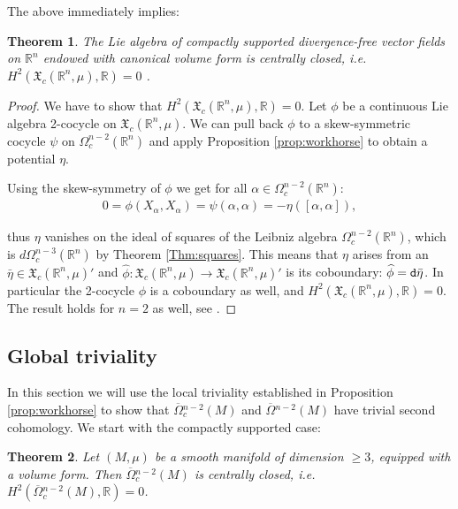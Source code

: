 \documentclass{article}
\newcommand{\fX}{\mathfrak{X}}
\newcommand{\R}{\mathbb{R}}
\newcommand{\oline}{\overline}
\newcommand{\dd}{{\tt d}}
\newtheorem{Theorem}{Theorem}[section]
\theoremstyle{definition}
\begin{document}
The above immediately implies:

\begin{Theorem}
\label{thm:local}
The Lie algebra of compactly supported divergence-free vector fields on $\R^n$ endowed with canonical volume form is centrally closed, i.e.~$H^2(\fX_c(\R^n,\mu),\R)=0$ .
\end{Theorem}

\begin{proof}
We have to show that $H^2(\fX_c(\R^n,\mu),\R)=0$. Let $\phi$ be a continuous Lie algebra 2-cocycle on $\fX_{c}(\R^n,\mu)$. We can pull back $\phi$ to a skew-symmetric cocycle $\psi$ on $\Omega^{n-2}_c(\R^n)$ and apply Proposition \ref{prop:workhorse} to obtain a potential $\eta$.


Using the skew-symmetry of $\phi$ we get for all $\alpha\in\Omega_c^{n-2}(\mathbb R^n)$:
\begin{align}\label{eq:vanonex}
  0=\phi(X_\alpha,X_\alpha)
  =\psi(\alpha,\alpha)
  =-\eta([\alpha,\alpha]),  
\end{align}

thus $\eta$ vanishes on the ideal of squares of the Leibniz algebra $\Omega_c^{n-2}(\mathbb R^n)$, which is  $d\Omega^{n-3}_{c}(\R^n)$ by Theorem \ref{Thm:squares}.
This means that $\eta$ arises from an $\bar\eta\in\fX_c(\R^n,\mu)'$ and $\widehat\phi \colon \fX_{c}(\R^n, \mu) \rightarrow  \fX_{c}(\R^n, \mu)'$ is its coboundary: $\widehat\phi=\dd\bar\eta$.
In particular the 2-cocycle $\phi$ is a coboundary as well, and $H^2(\fX_c(\R^n,\mu),\R)=0$.
The result holds for $n=2$ as well, see \cite{JV16}.
\end{proof}





\subsection{Global triviality}\label{subs:globtriv}

In this section we will use the local triviality established in Proposition \ref{prop:workhorse} to show that $\oline{\Omega}{}_c^{n-2}(M)$ and $\oline{\Omega}{}^{n-2}(M)$ have trivial second cohomology. We start with the compactly supported case:



\begin{Theorem} \label{prop:mainc}Let $(M,\mu)$ be a smooth manifold of dimension $\geq 3$, equipped with a volume form. Then 
$\oline{\Omega}{}_c^{n-2}(M)$ is centrally closed, i.e. $H^2(\oline{\Omega}{}_c^{n-2}(M),\R)=0$.
\end{Theorem}
\end{document}
